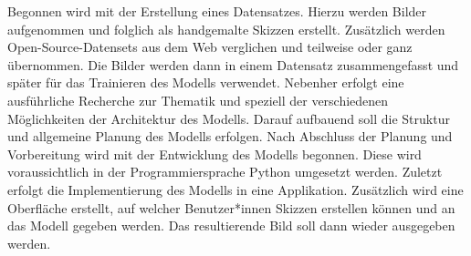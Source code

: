 \documentclass[12pt,a4paper]{article}
\begin{document}
	Begonnen wird mit der Erstellung eines Datensatzes. 
	Hierzu werden Bilder aufgenommen und folglich als handgemalte Skizzen erstellt. 
	Zusätzlich werden Open-Source-Datensets aus dem Web verglichen und teilweise oder ganz übernommen. 
	Die Bilder werden dann in einem Datensatz zusammengefasst und später für das Trainieren des Modells verwendet. 
	Nebenher erfolgt eine ausführliche Recherche zur Thematik und speziell der verschiedenen Möglichkeiten der Architektur des Modells. 
	Darauf aufbauend soll die Struktur und allgemeine Planung des Modells erfolgen. 
	Nach Abschluss der Planung und Vorbereitung wird mit der Entwicklung des Modells begonnen. 
	Diese wird voraussichtlich in der Programmiersprache Python umgesetzt werden. 
	Zuletzt erfolgt die Implementierung des Modells in eine Applikation. 
	Zusätzlich wird eine Oberfläche erstellt, auf welcher Benutzer*innen Skizzen erstellen können und an das Modell gegeben werden. 
	Das resultierende Bild soll dann wieder ausgegeben werden.
\end{document}
